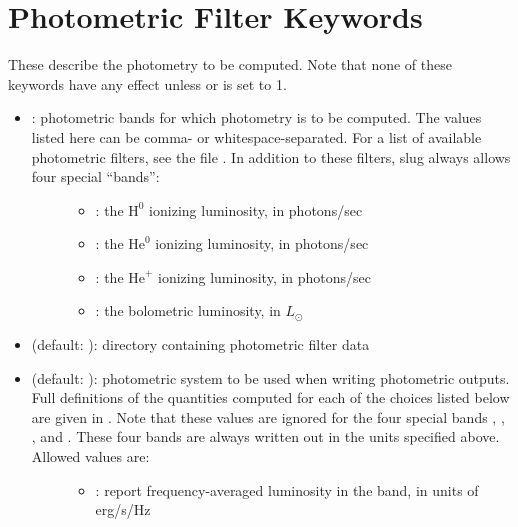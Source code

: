 \documentclass[letterpaper,10pt,english]{sphinxmanual}
\begin{document}
\section{Photometric Filter Keywords}
\label{\detokenize{parameters:ssec-phot-keywords}}\label{\detokenize{parameters:photometric-filter-keywords}}
These describe the photometry to be computed. Note that none of these keywords have any effect unless  or  is set to 1.
\begin{itemize}
\item {} \begin{description}
\item[{: photometric bands for which photometry is to be computed. The values listed here can be comma- or whitespace-separated. For a list of available photometric filters, see the file . In addition to these filters, slug always allows four special “bands”:}] \leavevmode\begin{itemize}
\item {} 
: the \(\mathrm{H}^0\) ionizing luminosity, in photons/sec

\item {} 
: the \(\mathrm{He}^0\) ionizing luminosity, in photons/sec

\item {} 
: the \(\mathrm{He}^+\) ionizing luminosity, in photons/sec

\item {} 
: the bolometric luminosity, in \(L_\odot\)

\end{itemize}

\end{description}

\item {} 
 (default: ): directory containing photometric filter data

\item {} \begin{description}
\item[{ (default: ): photometric system to be used when writing photometric outputs. Full definitions of the quantities computed for each of the choices listed below are given in {\hyperref[\detokenize{intro:ssec-spec-phot}]{}}. Note that these values are ignored for the four special bands , , , and . These four bands are always written out in the units specified above. Allowed values are:}] \leavevmode\begin{itemize}
\item {} 
: report frequency-averaged luminosity in the band, in units of erg/s/Hz


\end{itemize}
\end{description}
\end{itemize}
\end{document}

